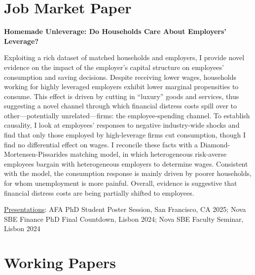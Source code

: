 \documentclass[letterpaper]{article}
\newenvironment{itemize*}{
  \begin{list}{}{
    \setlength{\leftmargin}{1.5em}
  }
}{
  \end{list}
}
\begin{document}
\section*{Job Market Paper}
\vspace{-0.2in}
\hrulefill
\begin{itemize*}
\item \textbf{Homemade Unleverage: Do Households Care About Employers' Leverage?}
\item Exploiting a rich dataset of matched households and employers, I provide novel evidence on the impact of the employer's capital structure on employees' consumption and saving decisions. Despite receiving lower wages, households working for highly leveraged employers exhibit lower marginal propensities to consume. This effect is driven by cutting in ``luxury'' goods and services, thus suggesting a novel channel through which financial distress costs spill over to other---potentially unrelated---firms: the employee-spending channel. To establish causality, I look at employees' responses to negative industry-wide shocks and find that only those employed by high-leverage firms cut consumption, though I find no differential effect on wages. I reconcile these facts with a Diamond-Mortensen-Pissarides matching model, in which heterogeneous risk-averse employees bargain with heterogeneous employers to determine wages. Consistent with the model, the consumption response is mainly driven by poorer households, for whom unemployment is more painful. Overall, evidence is suggestive that financial distress costs are being partially shifted to employees.

\underline{Presentations}: AFA PhD Student Poster Session, San Francisco, CA 2025; Nova SBE Finance PhD Final Countdown, Lisbon 2024; Nova SBE Faculty Seminar, Lisbon 2024
\end{itemize*}

\section*{Working Papers}
\vspace{-0.2in}
\hrulefill
\end{document}
